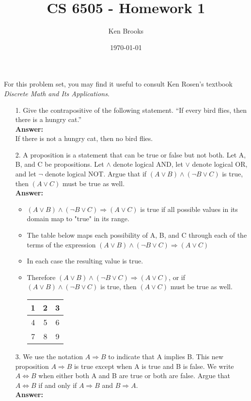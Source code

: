 \documentclass[12pt]{amsart}
\title{CS 6505 - Homework 1}
\author{Ken Brooks}
\date{\today}
\begin{document}
\maketitle
 
\noindent For this problem set, you may find it useful to consult Ken Rosen’s textbook \emph{Discrete Math and Its Applications}.
 
\vspace{.2in}
\begin{itemize}
\item[{\rm 1.}] Give the contrapositive of the following statement. ``If every bird flies, then there is a hungry cat.''
\\[.2in]\textbf{Answer:}
\\[.2in]If there is not a hungry cat, then no bird flies.
 
 
\vspace{.2in}
\item[{\rm 2.}]  A proposition is a statement that can be true or false but not both.  Let A, B, and C be propositions. Let $\land$ denote logical AND, let $\lor$ denote logical OR, and let $\lnot$ denote logical NOT.  Argue that if $(A\lor B)\land(\lnot B\lor C)$ is true, then $(A \lor C)$ must be true as well.
\\[.2in]\textbf{Answer:}
\begin{itemize}
\item $(A\lor B)\land(\lnot B\lor C)\Rightarrow(A \lor C)$ is true if all possible values in its domain map to "true" in its range.
\item The table below maps each possibility of A, B, and C through each of the terms of the expression $(A\lor B)\land(\lnot B\lor C)\Rightarrow(A \lor C)$
\item In each case the resulting value is true.
\item Therefore $(A\lor B)\land(\lnot B\lor C)\Rightarrow(A \lor C)$, or if $(A\lor B)\land(\lnot B\lor C)$ is true, then $(A \lor C)$ must be true as well.
\vspace{.2in}
\item[]
\begin{tabular} {| c | c | c |}
  \hline
  1 & 2 & 3 \\ \hline
  4 & 5 & 6 \\ \hline
  7 & 8 & 9 \\ \hline
\end{tabular}
\end{itemize}

\vspace{.2in}
\item[{\rm 3.}] We use the notation $A\Rightarrow B$ to indicate that A implies B.  This new proposition $A\Rightarrow B$ is true except when A is true and B is false.  We write $A\Leftrightarrow B$ when either both A and B are true or both are false.  Argue that $A\Leftrightarrow B$ if and only if $A\Rightarrow B$ and $B\Rightarrow A$.
\\[.2in]\textbf{Answer:}
 

\end{itemize}
\end{document}
